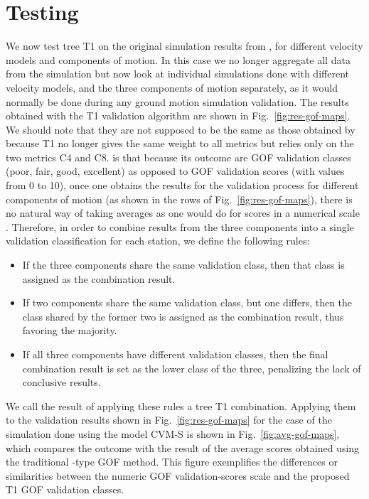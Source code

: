 
\section{Testing}

We now test tree T1 on the original simulation results from \citet{Taborda_2014_BSSA}, for different velocity models and components of motion. In this case we no longer aggregate all data from the simulation but now look at individual simulations done with different velocity models, and the three components of motion separately, as it would normally be done during any ground motion simulation validation. The results obtained with the T1 validation algorithm are shown in Fig.~\ref{fig:res-gof-maps}. We should note that they are not supposed to be the same as those obtained by \citet{Taborda_2014_BSSA} because T1 no longer gives the same weight to all metrics but relies only on the two metrics C4 and C8.  is that because its outcome are GOF validation classes (poor, fair, good, excellent) as opposed to GOF validation scores (with values from 0 to 10), once one obtains the results for the validation process for different components of motion (as shown in the rows of Fig.~\ref{fig:res-gof-maps}), there is no natural way of taking averages as one would do for scores in a numerical scale \citep[i.e., as typically done when using][]{Anderson_2004_Proc}. Therefore, in order to combine results from the three components into a single validation classification for each station, we define the following rules:

\begin{itemize}
	\setlength\itemsep{0ex}
	\item If the three components share the same validation class, then that class is assigned as the combination result.
	\item If two components share the same validation class, but one differs, then the class shared by the former two is assigned as the combination result, thus favoring the majority.
	\item If all three components have different validation classes, then the final combination result is set as the lower class of the three, penalizing the lack of conclusive results.
\end{itemize}

We call the result of applying these rules a tree T1 combination. Applying them to the validation results shown in Fig.~\ref{fig:res-gof-maps} for the case of the simulation done using the model CVM-S is shown in Fig.~\ref{fig:avg-gof-maps}, which compares the outcome with the result of the average scores obtained using the traditional \citet{Anderson_2004_Proc}-type GOF method. This figure exemplifies the differences or similarities between the numeric GOF validation-scores scale and the proposed T1 GOF validation classes.

